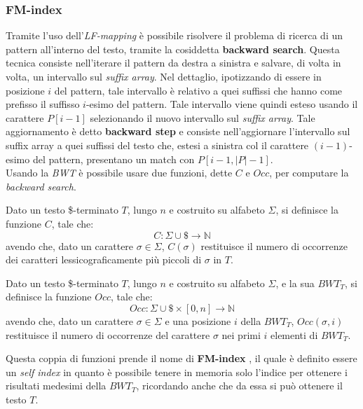 \subsubsection{FM-index}
Tramite l'uso dell'\textit{LF-mapping} è possibile risolvere il problema di
ricerca di un pattern all'interno del testo, tramite la cosiddetta
\textbf{backward search}. Questa tecnica consiste nell'iterare il pattern da
destra a sinistra e
salvare, di volta in volta, un intervallo sul \textit{suffix array}. Nel
dettaglio, ipotizzando di essere in posizione $i$ del pattern, tale
intervallo è relativo a quei suffissi che hanno come prefisso il suffisso
$i$-esimo del pattern. Tale intervallo viene quindi esteso usando il carattere
$P[i-1]$ selezionando il nuovo intervallo sul \textit{suffix array}. Tale
aggiornamento è detto \textbf{backward step} e consiste nell'aggiornare
l'intervallo sul suffix array a quei suffissi del testo che, estesi a sinistra
col il carattere $(i-1)$-esimo del pattern, presentano un match con $P[i-1,
|P|-1]$.\\  
Usando la \textit{BWT} è possibile usare due funzioni, dette $C$ e $Occ$, per
computare la \textit{backward search}.
\begin{definizione}
  Dato un testo \$-terminato $T$, lungo $n$ e costruito su alfabeto $\Sigma$, si
  definisce la funzione $C$, tale che:
  \[C:\Sigma\cup \$\to \mathbb{N}\]
  avendo che, dato un carattere $\sigma\in\Sigma$, $C(\sigma)$ restituisce il
  numero di 
  occorrenze dei caratteri lessicograficamente più piccoli di $\sigma$ in $T$.
\end{definizione}
\begin{definizione}
  Dato un testo \$-terminato $T$, lungo $n$ e costruito su alfabeto $\Sigma$, e
  la sua $BWT_T$, si definisce la funzione $Occ$, tale che:
  \[Occ:\Sigma\cup \$\times [0,n]\to \mathbb{N}\]
  avendo che, dato un carattere $\sigma\in\Sigma$ e una posizione $i$ della
  $BWT_T$, $Occ(\sigma,i)$ restituisce il numero di occorrenze del carattere
  $\sigma$ nei primi $i$ elementi di $BWT_T$.
\end{definizione}
Questa coppia di funzioni prende il nome di \textbf{FM-index} \cite{fm}, il
quale è definito essere un \textit{self index} in quanto è possibile tenere in
memoria solo l'indice per ottenere i risultati medesimi della $BWT_T$,
ricordando anche che da essa si può ottenere il testo $T$.
